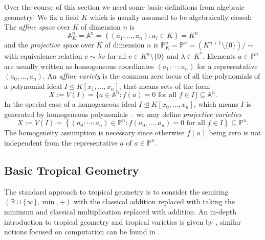 \documentclass[
  paper=a4,
  titlepage,
  bibliography=totoc,
  listof=totoc,
  pagesize=pdftex
]{scrartcl}
\numberwithin{figure}{section}
\numberwithin{equation}{section}
\numberwithin{table}{section}
\newcommand*\setR{\mathds{R}}
\newcommand*\setA{\mathds{A}}
\newcommand*\setP{\mathds{P}}
\let\idealof\trianglelefteq
\theoremstyle{definition}
\numberwithin{definition}{section}
\begin{document}
Over the course of this section we need some basic definitions from algebraic geometry: We
fix a field $K$ which is usually assumed to be algebraically closed: The \emph{affine
space} over $K$ of dimension $n$ is
\[
  \setA_K^n = \setA^n = \left\{ (a_1,\dots,a_n) : a_i \in K\right\} = K^n
\]
and the \emph{projective space} over $K$ of dimension $n$ is $\setP^n_K = \setP^n =
(K^{n+1}\setminus\{0\})/\sim$ with equivalence relation $v \sim \lambda v$ for all $v \in
K^n\setminus \{0\}$ and $\lambda \in K^*$. Elements $a \in \setP^n$ are usually written as
homogeneous coordinates $(a_1:\cdots:a_n)$ for a representative $(a_0, \dots, a_n)$. An
\emph{affine variety} is the common zero locus of all the polynomials of a polynomial
ideal $I \idealof K[x_1, \dots, x_n]$, that means sets of the form
\[
  X := V(I) = \{ a \in \setA^n : f(a) = 0 \text{ for all $f\in I$} \} \subseteq \setA^n.
\]
In the special case of a homogeneous ideal $I \idealof K[x_0,\dots,x_n]$, which means $I$
is generated by homogeneous polynomials -- we may define \emph{projective varieties}
\[
  X := V(I) = \left\{ (a_0:\cdots:a_n) \in \setP^n : f(a_0, \dots, a_n) = 0
    \text{ for all $f \in I$}
  \right\} \subseteq \setP^n.
\]
The homogeneity assumption is necessary since otherwise $f(a)$ being zero is not
independent from the representative $a$ of $a\in \setP^n$.

\subsection{Basic Tropical Geometry}
\label{sec:tropIntro}

The standard approach to tropical geometry is to consider the semiring $(\setR \cup
\{\infty\}, \min, +)$ with the classical addition replaced with taking the minimum and
classical multiplication replaced with addition. An in-depth introduction to tropical
geometry and tropical varieties is given by \cite{sturmMacTrop}, similar notions focused
on computation can be found in \cite{compTropVar}.
\end{document}
